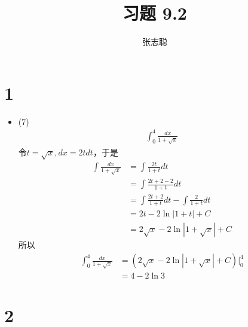 \documentclass{article}
\begin{document}
\title{习题 9.2}
\author{张志聪}
\maketitle

\section*{1}

\begin{itemize}
  \item (7)
        \begin{align*}
          \int_{0}^{4} \frac{dx}{1 + \sqrt{x}}
        \end{align*}
        令$t = \sqrt{x}, dx = 2t dt$，于是
        \begin{align*}
          \int \frac{dx}{1 + \sqrt{x}}
           & = \int \frac{2t}{1 + t} dt                               \\
           & = \int \frac{2t + 2 - 2}{1 + t} dt                       \\
           & = \int \frac{2t + 2}{1 + t} dt - \int \frac{2}{1 + t} dt \\
           & = 2t - 2 \ln |1 + t| + C                                 \\
           & = 2\sqrt{x} - 2 \ln |1 + \sqrt{x}| + C
        \end{align*}
        所以
        \begin{align*}
          \int_{0}^{4} \frac{dx}{1 + \sqrt{x}}
           & = (2\sqrt{x} - 2 \ln |1 + \sqrt{x}| + C) \bigg|_0^4 \\
           & = 4 - 2 \ln 3
        \end{align*}

\end{itemize}

\section*{2}
\end{document}
